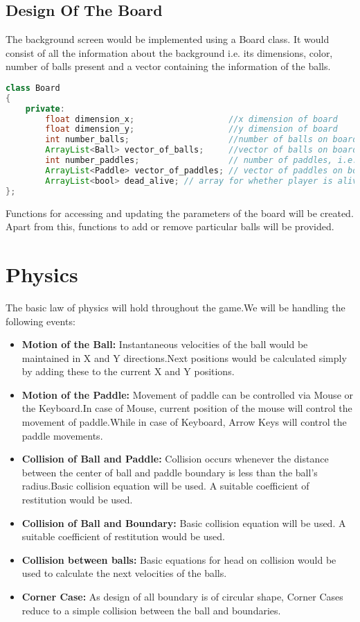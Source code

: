 \documentclass{article}
\begin{document}
\subsection{Design Of The Board} The background screen would be implemented using a Board class. It would consist of all the information about the background i.e. its dimensions, color, number of balls present and a vector containing the information of the balls.

\begin{lstlisting}[language=Java, caption={Class Parameters for Board}]
class Board
{
	private:
		float dimension_x;                   //x dimension of board
		float dimension_y;                   //y dimension of board
		int number_balls;                    //number of balls on board
		ArrayList<Ball> vector_of_balls;     //vector of balls on board
		int number_paddles;					 // number of paddles, i.e. players
		ArrayList<Paddle> vector_of_paddles; // vector of paddles on board
		ArrayList<bool> dead_alive;	// array for whether player is alive/dead
};

\end{lstlisting}

Functions for accessing and updating the parameters of the board will be created. Apart from this, functions to add or remove particular balls will be provided.

			\section{Physics}
			\par\noindent The basic law of physics will hold throughout the game.We will be handling the following events:
			\begin{itemize}
			\item \textbf{Motion of the Ball:} Instantaneous velocities of the ball would be maintained in X and Y directions.Next positions would be calculated simply by adding these to the current X and Y positions.
			\item \textbf{Motion of the Paddle:} Movement of paddle can be controlled via Mouse or the Keyboard.In case of Mouse, current position of the mouse will control the movement of paddle.While in case of Keyboard, Arrow Keys will control the paddle movements.
			\item \textbf{Collision of Ball and Paddle:} Collision occurs whenever the distance between the center of ball and paddle boundary is less than the ball's radius.Basic collision equation will be used. A suitable coefficient of restitution would be used.
			\item \textbf{Collision of Ball and Boundary:} Basic collision equation will be used. A suitable coefficient of restitution would be used.
			\item \textbf{Collision between balls:} Basic equations for head on collision would be used to calculate the next velocities of the balls.
			\item \textbf{Corner Case:} As design of all boundary is of circular shape, Corner Cases reduce to a simple collision between the ball and boundaries. 
			\end{itemize}
			
\end{document}
